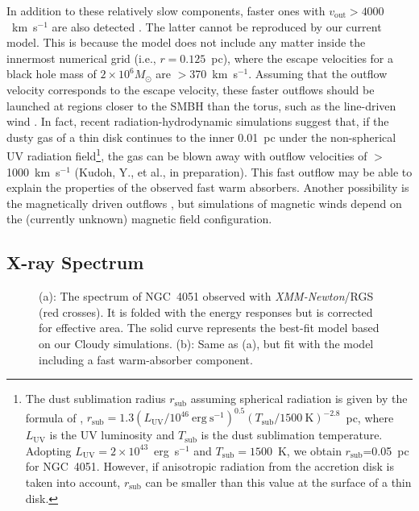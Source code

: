 \documentclass[twocolumn,times,twocolappendix]{aastex63}
\begin{document}
In addition to these relatively slow components, 
faster ones with $v_\mathrm{out} > 4000$~km~s$^{-1}$ are also detected
\citep{Steenbrugge2009,Lobban2011,Pounds2011,Silva2016,Mizumoto2017}. The latter cannot be reproduced by
our current model.
This is because the model does not include
any matter
inside the innermost numerical grid (i.e., $r =0.125$~pc), where the
  escape velocities for a black hole mass of $2 \times 10^6 M_\odot$ are
  $>$370~km~s$^{-1}$. Assuming that the outflow velocity corresponds
to the escape velocity, these faster outflows should be launched at 
regions closer to the SMBH than the torus, 
such as the line-driven wind \citep[e.g.,][for UFOs]{Nomura2017,Nomura2020}.
In fact, recent radiation-hydrodynamic simulations suggest that, 
if the dusty gas of a thin disk continues to the inner 0.01~pc under the non-spherical UV radiation field\footnote{The dust sublimation radius $r_\mathrm{sub}$ assuming spherical radiation 
is given by the formula of \citet{Barvainis1987},
$r_\mathrm{sub} = 1.3 \left( L_\mathrm{UV}/10^{46} \ \mathrm{erg \ s}^{-1} \right)^{0.5} \left( T_\mathrm{sub}/1500 \ \mathrm{K} \right)^{-2.8}$~pc, 
where $L_\mathrm{UV}$ is the UV luminosity
and $T_\mathrm{sub}$ is the dust sublimation temperature.
Adopting $L_\mathrm{UV} = 2\times10^{43}$~erg~s$^{-1}$ and
$T_\mathrm{sub} = 1500$~K, we obtain $r_\mathrm{sub}$=0.05~pc for
NGC~4051.
However,
if anisotropic radiation from the accretion disk
is taken into account, $r_\mathrm{sub}$ can be smaller than this value at
the surface of a thin disk\citep[see e.g.,][]{Kawaguchi2010}.},
the gas can be 
blown away with outflow velocities of $>$1000~km~s$^{-1}$ (Kudoh, Y., et al., in preparation). 
This fast outflow may be able to explain the properties of the observed fast warm absorbers.
Another possibility is the magnetically driven outflows \citep[e.g.,][]{Fukumura2010,Fukumura2014}, but
simulations of magnetic winds depend on the (currently unknown) magnetic field configuration.



\subsection{X-ray Spectrum}
\label{sec4.2}

\begin{figure}
\caption{
(a): The spectrum of NGC~4051
observed with \textit{XMM-Newton}/RGS (red crosses). It is 
folded with the energy responses but is corrected for effective area.
The solid curve represents the best-fit model based on our \textsf{Cloudy}
simulations. 
(b): Same as (a), but fit with the model including
a fast warm-absorber component.}
\label{fig-spec}
\end{figure}
\end{document}
